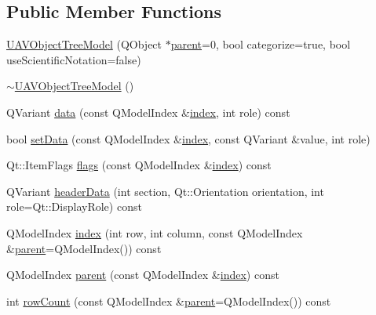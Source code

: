 \subsection*{\-Public \-Member \-Functions}
\begin{DoxyCompactItemize}
\item 
\hyperlink{group___u_a_v_object_browser_plugin_ga7c48c4fa7c5b464e0127d929f8610964}{\-U\-A\-V\-Object\-Tree\-Model} (\-Q\-Object $\ast$\hyperlink{group___u_a_v_object_browser_plugin_ga8d23a2cd6d6b785179ebd12426f142e3}{parent}=0, bool categorize=true, bool use\-Scientific\-Notation=false)
\item 
\hyperlink{group___u_a_v_object_browser_plugin_ga162709965b0a670c87305d09bf3d5e76}{$\sim$\-U\-A\-V\-Object\-Tree\-Model} ()
\item 
\-Q\-Variant \hyperlink{group___u_a_v_object_browser_plugin_ga7e2af1d5c89b55437fb74df890b24a53}{data} (const \-Q\-Model\-Index \&\hyperlink{group___u_a_v_object_browser_plugin_ga9b9e52145b78d333effe586a41478701}{index}, int role) const 
\item 
bool \hyperlink{group___u_a_v_object_browser_plugin_ga3327e2ff6b418ae404a06d7c990fbc50}{set\-Data} (const \-Q\-Model\-Index \&\hyperlink{group___u_a_v_object_browser_plugin_ga9b9e52145b78d333effe586a41478701}{index}, const \-Q\-Variant \&value, int role)
\item 
\-Qt\-::\-Item\-Flags \hyperlink{group___u_a_v_object_browser_plugin_ga16ae36c54433edd7b07439edc1264b59}{flags} (const \-Q\-Model\-Index \&\hyperlink{group___u_a_v_object_browser_plugin_ga9b9e52145b78d333effe586a41478701}{index}) const 
\item 
\-Q\-Variant \hyperlink{group___u_a_v_object_browser_plugin_gaa19ce01eb026443086adfe5063bbc233}{header\-Data} (int section, \-Qt\-::\-Orientation orientation, int role=\-Qt\-::\-Display\-Role) const 
\item 
\-Q\-Model\-Index \hyperlink{group___u_a_v_object_browser_plugin_ga9b9e52145b78d333effe586a41478701}{index} (int row, int column, const \-Q\-Model\-Index \&\hyperlink{group___u_a_v_object_browser_plugin_ga8d23a2cd6d6b785179ebd12426f142e3}{parent}=\-Q\-Model\-Index()) const 
\item 
\-Q\-Model\-Index \hyperlink{group___u_a_v_object_browser_plugin_ga8d23a2cd6d6b785179ebd12426f142e3}{parent} (const \-Q\-Model\-Index \&\hyperlink{group___u_a_v_object_browser_plugin_ga9b9e52145b78d333effe586a41478701}{index}) const 
\item 
int \hyperlink{group___u_a_v_object_browser_plugin_ga77552bcb5a7016909e6de111fb100744}{row\-Count} (const \-Q\-Model\-Index \&\hyperlink{group___u_a_v_object_browser_plugin_ga8d23a2cd6d6b785179ebd12426f142e3}{parent}=\-Q\-Model\-Index()) const 

\end{DoxyCompactItemize}

